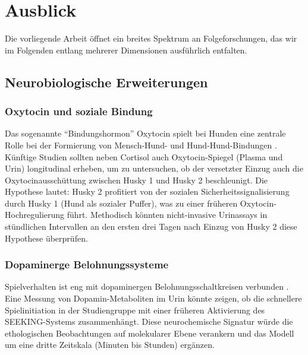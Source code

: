 ﻿\documentclass[12pt, a4paper]{article}
\theoremstyle{plain}
\theoremstyle{definition}
\theoremstyle{remark}
\begin{document}
\section{Ausblick}
\label{sec:ausblick}

Die vorliegende Arbeit öffnet ein breites Spektrum an Folgeforschungen, das
wir im Folgenden entlang mehrerer Dimensionen ausführlich entfalten.

\subsection{Neurobiologische Erweiterungen}

\subsubsection{Oxytocin und soziale Bindung}

Das sogenannte ``Bindungshormon'' Oxytocin spielt bei Hunden eine zentrale
Rolle bei der Formierung von Mensch-Hund- und Hund-Hund-Bindungen
\cite{nagasawa2015social}. Künftige Studien sollten neben Cortisol auch
Oxytocin-Spiegel (Plasma und Urin) longitudinal erheben, um zu untersuchen,
ob der versetzter Einzug auch die Oxytocinausschüttung zwischen Husky 1 und
Husky 2 beschleunigt. Die Hypothese lautet: Husky 2 profitiert von der
sozialen Sicherheitssignalisierung durch Husky 1 (Hund als sozialer Puffer),
was zu einer früheren Oxytocin-Hochregulierung führt. Methodisch könnten
nicht-invasive Urinassays in stündlichen Intervallen an den ersten drei Tagen
nach Einzug von Husky 2 diese Hypothese überprüfen.

\subsubsection{Dopaminerge Belohnungssysteme}

Spielverhalten ist eng mit dopaminergen Belohnungsschaltkreisen verbunden
\cite{panksepp1998affective}. Eine Messung von Dopamin-Metaboliten im
Urin könnte zeigen, ob die schnellere Spielinitiation in der Studiengruppe
mit einer früheren Aktivierung des SEEKING-Systems zusammenhängt. Diese
neurochemische Signatur würde die ethologischen Beobachtungen auf molekularer
Ebene verankern und das Modell um eine dritte Zeitskala (Minuten bis Stunden)
ergänzen.
\end{document}
